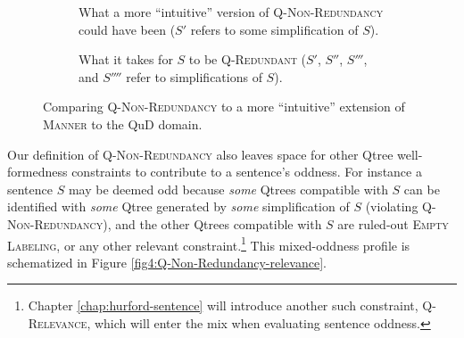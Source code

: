 \begin{figure}[H]
	\centering
	\begin{subfigure}[b]{.3\linewidth}
		\centering
		\caption[]{What a more ``intuitive'' version of \textsc{Q-Non-Redundancy} could have been ($S'$ refers to some simplification of $S$).}\label{fig4:redundancy-intuitive-extension}
	\end{subfigure}\hfill
	\begin{subfigure}[b]{.65\linewidth}
		\centering
		\caption[]{What it takes for $S$ to be \textsc{Q-Redundant} ($S'$, $S''$, $S'''$, and $S''''$ refer to simplifications of $S$).}\label{fig4:Q-Non-Redundancy}
	\end{subfigure}
	\caption[]{Comparing \textsc{Q-Non-Redundancy} to a more ``intuitive'' extension of \textsc{Manner} to the QuD domain.}
\end{figure}

Our definition of \textsc{Q-Non-Redundancy} also leaves space for other Qtree well-formedness constraints to contribute to a sentence's oddness. For instance a sentence $S$ may be deemed odd because \textit{some} Qtrees compatible with $S$ can be identified with \textit{some} Qtree generated by \textit{some} simplification of $S$ (violating \textsc{Q-Non-Redundancy}), and the other Qtrees compatible with $S$ are ruled-out \textsc{Empty Labeling}, or any other relevant constraint.\footnote{Chapter \ref{chap:hurford-sentence} will introduce another such constraint, \textsc{Q-Relevance}, which will enter the mix when evaluating sentence oddness.} This mixed-oddness profile is schematized in Figure \ref{fig4:Q-Non-Redundancy-relevance}.

